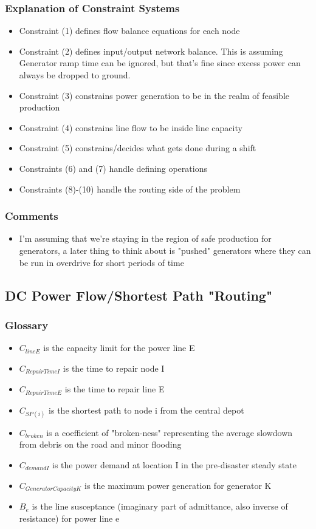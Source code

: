 \documentclass{article}
\begin{document}
	\subsubsection{Explanation of Constraint Systems}
	\begin{itemize}
		\item Constraint (1) defines flow balance equations for each node
		\item Constraint (2) defines input/output network balance. This is assuming Generator ramp time can be ignored, but that's fine since excess power can always be dropped to ground.
		\item Constraint (3) constrains power generation to be in the realm of feasible production
		\item Constraint (4) constrains line flow to be inside line capacity
		\item Constraint (5) constrains/decides what gets done during a shift
		\item Constraints (6) and (7) handle defining operations
		\item Constraints (8)-(10) handle the routing side of the problem
	\end{itemize}
	\subsubsection{Comments}
	\begin{itemize}
		\item I'm assuming that we're staying in the region of safe production for generators, a later thing to think about is "pushed" generators where they can be run in overdrive for short periods of time
		\end{itemize}
	\subsection{DC Power Flow/Shortest Path "Routing"}	
	\subsubsection{Glossary}
	\begin{itemize}
		\item $C_{lineE}$ is the capacity limit for the power line E
		\item $C_{RepairTimeI}$ is the time to repair node I
		\item $C_{RepairTimeE}$ is the time to repair line E
		\item $C_{SP(i)}$ is the shortest path to node i from the central depot
		\item $C_{broken}$ is a coefficient of "broken-ness" representing the average slowdown from debris on the road and minor flooding
		\item $C_{demandI}$ is the power demand at location I in the pre-disaster steady state
		\item $C_{GeneratorCapacityK}$ is the maximum power generation for generator K
		\item $B_e$ is the line susceptance (imaginary part of admittance, also inverse of resistance) for power line e
	\end{itemize}
\end{document}
